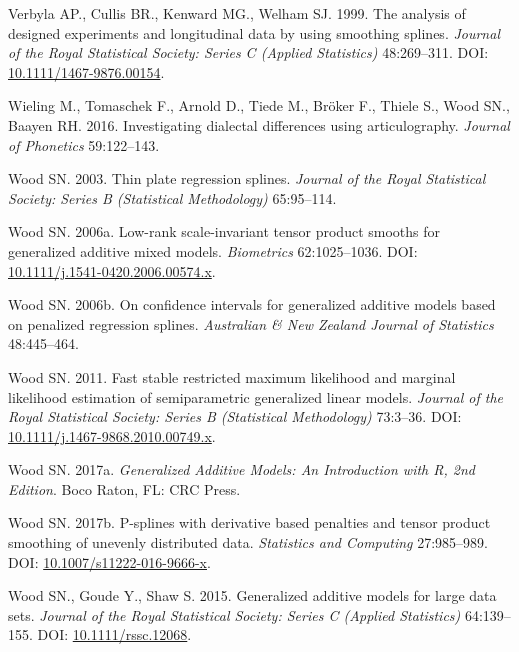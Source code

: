 \documentclass[12pt]{article}
\begin{document}
\hypertarget{ref-verbyla_analysis_2002}{}
Verbyla AP., Cullis BR., Kenward MG., Welham SJ. 1999. The analysis of
designed experiments and longitudinal data by using smoothing splines.
\emph{Journal of the Royal Statistical Society: Series C (Applied
Statistics)} 48:269--311. DOI:
\href{https://doi.org/10.1111/1467-9876.00154}{10.1111/1467-9876.00154}.

\hypertarget{ref-wieling_investigating_2016}{}
Wieling M., Tomaschek F., Arnold D., Tiede M., Bröker F., Thiele S.,
Wood SN., Baayen RH. 2016. Investigating dialectal differences using
articulography. \emph{Journal of Phonetics} 59:122--143.

\hypertarget{ref-wood_thin_2003}{}
Wood SN. 2003. Thin plate regression splines. \emph{Journal of the Royal
Statistical Society: Series B (Statistical Methodology)} 65:95--114.

\hypertarget{ref-wood_lowrank_2006}{}
Wood SN. 2006a. Low-rank scale-invariant tensor product smooths for
generalized additive mixed models. \emph{Biometrics} 62:1025--1036. DOI:
\href{https://doi.org/10.1111/j.1541-0420.2006.00574.x}{10.1111/j.1541-0420.2006.00574.x}.

\hypertarget{ref-wood_confidence_2006}{}
Wood SN. 2006b. On confidence intervals for generalized additive models
based on penalized regression splines. \emph{Australian \& New Zealand
Journal of Statistics} 48:445--464.

\hypertarget{ref-wood_fast_2011}{}
Wood SN. 2011. Fast stable restricted maximum likelihood and marginal
likelihood estimation of semiparametric generalized linear models.
\emph{Journal of the Royal Statistical Society: Series B (Statistical
Methodology)} 73:3--36. DOI:
\href{https://doi.org/10.1111/j.1467-9868.2010.00749.x}{10.1111/j.1467-9868.2010.00749.x}.

\hypertarget{ref-wood_generalized_2017}{}
Wood SN. 2017a. \emph{Generalized Additive Models: An Introduction with
R, 2nd Edition}. Boco Raton, FL: CRC Press.

\hypertarget{ref-wood_p_splines_2017}{}
Wood SN. 2017b. P-splines with derivative based penalties and tensor
product smoothing of unevenly distributed data. \emph{Statistics and
Computing} 27:985--989. DOI:
\href{https://doi.org/10.1007/s11222-016-9666-x}{10.1007/s11222-016-9666-x}.

\hypertarget{ref-wood_generalized_2015}{}
Wood SN., Goude Y., Shaw S. 2015. Generalized additive models for large
data sets. \emph{Journal of the Royal Statistical Society: Series C
(Applied Statistics)} 64:139--155. DOI:
\href{https://doi.org/10.1111/rssc.12068}{10.1111/rssc.12068}.
\end{document}
